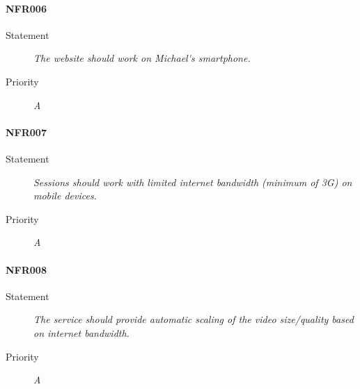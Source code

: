 \paragraph{NFR006}
\begin{description}
  \item [Statement] 
    \textit{The website should work on \gls{Michael's smartphone}.}
  \item [Priority] \textit{A}
\end{description}

\paragraph{NFR007}
\begin{description}
  \item [Statement] 
    \textit{\gls{Session}s should work with limited internet bandwidth (minimum of \gls{3G}) on mobile devices.}
  \item [Priority] \textit{A}
\end{description}

\paragraph{NFR008}
\begin{description}
  \item [Statement] 
    \textit{The service should provide automatic scaling of the video size/quality based on internet bandwidth.}
  \item [Priority] \textit{A}
\end{description}
